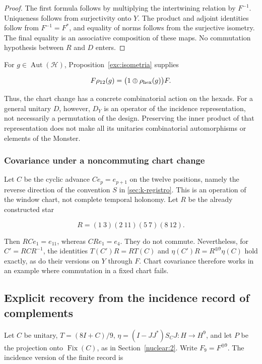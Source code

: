 \begin{proof}
The first formula follows by multiplying the intertwining relation by \(F^{-1}\). Uniqueness follows from surjectivity onto \(Y\). The product and adjoint identities follow from \(F^{-1}=F^*\), and equality of norms follows from the surjective isometry. The final equality is an associative composition of these maps. No commutation hypothesis between \(R\) and \(D\) enters.
\end{proof}

For \(g\in\operatorname{Aut}(\mathcal H)\), Proposition~\ref{exc:isometria} supplies

\[
F\rho_{12}(g)=\bigl(1\oplus\rho_{\rm hex}(g)\bigr)F.
\]

Thus, the chart change has a concrete combinatorial action on the hexads. For a general unitary \(D\), however, \(D_Y\) is an operator of the incidence representation, not necessarily a permutation of the design. Preserving the inner product of that representation does not make all its unitaries combinatorial automorphisms or elements of the Monster.

\subsubsection{Covariance under a noncommuting chart change}

Let \(C\) be the cyclic advance \(Ce_p=e_{p+1}\) on the twelve positions, namely the reverse direction of the convention \(S\) in \cref{sec:k-registro}. This is an operation of the window chart, not complete temporal holonomy. Let \(R\) be the already constructed star

\[
R=(1\ 3)(2\ 11)(5\ 7)(8\ 12).
\]

Then \(RCe_1=e_{11}\), whereas \(CRe_1=e_4\). They do not commute. Nevertheless, for \(C'=RCR^{-1}\), the identities \(T(C')R=RT(C)\) and \(\eta(C')R=R^{\oplus9}\eta(C)\) hold exactly, as do their versions on \(Y\) through \(F\). Chart covariance therefore works in an example where commutation in a fixed chart fails.

\subsection{Explicit recovery from the incidence record of complements}\label{nuc05:recuperacion}

Let \(C\) be unitary, \(T=(8I+C)/9\), \(\eta=(I-JJ^*)S_CJ:H\to H^9\), and let \(P\) be the projection onto \(\operatorname{Fix}(C)\), as in Section~\ref{nuclear:2}. Write \(F_9=F^{\oplus9}\). The incidence version of the finite record is

